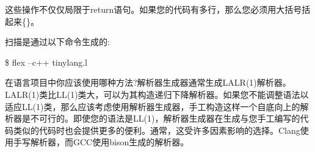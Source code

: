 这些操作不仅仅局限于return语句。如果您的代码有多行，那么您必须用大括号括起来\{\}。\par

扫描是通过以下命令生成的:\par

\begin{tcolorbox}[colback=white,colframe=black]
\$ flex –c++ tinylang.l
\end{tcolorbox}

在语言项目中你应该使用哪种方法?解析器生成器通常生成LALR(1)解析器。LALR(1)类比LL(1)类大，可以为其构造递归下降解析器。如果您不能调整语法以适应LL(1)类，那么应该考虑使用解析器生成器，手工构造这样一个自底向上的解析器是不可行的。即使您的语法是LL(1)，解析器生成器在生成与您手工编写的代码类似的代码时也会提供更多的便利。通常，这受许多因素影响的选择。Clang使用手写解析器，而GCC使用bison生成的解析器。\par




















